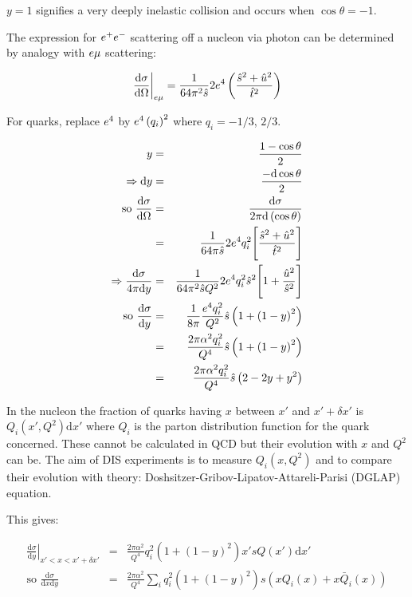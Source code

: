 $y = 1$ signifies a very deeply inelastic collision and occurs when $\cos\theta = -1$.

The expression for $e^+e^-$ scattering off a nucleon via photon can be determined by analogy with $e\mu$ scattering:

\[
  \left.\frac{\mathrm{d}\sigma}{\mathrm{d}\Omega}\right|_{e\mu} = \frac{1}{64\pi^2\hat{s}}2e^4\left(\frac{\hat{s}^2 + \hat{u}^2}{\hat{t}^2}\right)
\]

For quarks, replace $e^4$ by $e^4\left(q_i\right)^2$ where $q_i = -1/3$, $2/3$.

\begin{eqnarray*}
  y & = & \frac{1 - \cos\theta}{2} \\
  \Rightarrow \mathrm{d}y & = & \frac{-\mathrm{d}\cos\theta}{2} \\
  \textrm{so } \frac{\mathrm{d}\sigma}{\mathrm{d}\Omega} & = & \frac{\mathrm{d}\sigma}{2\pi\mathrm{d}\left(\cos\theta\right)} \\
  & = & \frac{1}{64\pi\hat{s}}2e^4q_i^2\Bigg[ \frac{\hat{s}^2 + \hat{u}^2}{\hat{t}^2}\Bigg] \\
  \Rightarrow \frac{\mathrm{d}\sigma}{4\pi\mathrm{d}y} & = & \frac{1}{64\pi^2\hat{s}Q^2}2e^4q_i^2\hat{s}^2\Bigg[ 1 + \frac{\hat{u}^2}{\hat{s}^2}\Bigg] \\ 
  \textrm{so } \frac{\mathrm{d}\sigma}{\mathrm{d}y} & = & \frac{1}{8\pi}\frac{e^4q_i^2}{Q^2}\hat{s}\left(1 + \left(1 - y\right)^2\right) \\
  & = & \frac{2\pi\alpha^2q_i^2}{Q^4}\hat{s}\left(1 + \left(1 - y\right)^2\right) \\
  & = & \frac{2\pi\alpha^2 q_i^2}{Q^4}\hat{s}\left(2 - 2y + y^2\right)
\end{eqnarray*}

In the nucleon the fraction of quarks having $x$ between $x'$ and $x' + \delta x'$ is $Q_i(x',Q^2) \mathrm{d}x'$ where $Q_i$ is the parton distribution function for the quark concerned.  These cannot be calculated in QCD but their evolution with $x$ and $Q^2$ can be.  The aim of DIS experiments is to measure $Q_i(x,Q^2)$ and to compare their evolution with theory:  Doshsitzer-Gribov-Lipatov-Attareli-Parisi (DGLAP) equation.

This gives:

\begin{eqnarray*}
  \left.\frac{\mathrm{d}\sigma}{\mathrm{d}y}\right|_{x'<x<x' + \delta x'} & = & \frac{2\pi\alpha^2}{Q^4}q_i^2\left(1 + \left(1 - y\right)^2\right)x'sQ(x')\mathrm{d}x' \\
  \textrm{so } \frac{\mathrm{d}\sigma}{\mathrm{d}x\mathrm{d}y} & = & \frac{2\pi\alpha^2}{Q^4}\sum_i q_i^2\left(1 + \left(1 - y\right)^2\right)s\left(xQ_i(x) + x\bar{Q}_i(x)\right)
\end{eqnarray*}

